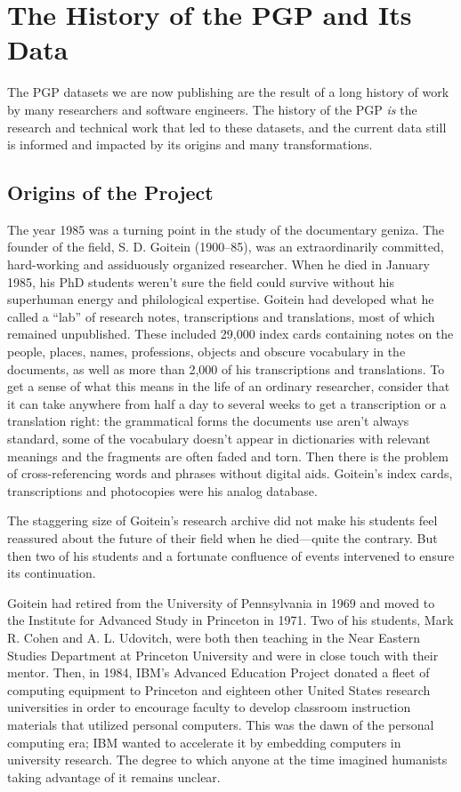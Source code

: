 \documentclass{article}
\begin{document}
\section{The History of the PGP and Its Data}

The PGP datasets we are now publishing are the result of a long history of work by many researchers and software engineers.  The history of the PGP \textit{is} the research and technical work that led to these datasets, and the current data still is informed and impacted by its origins and many transformations.

\subsection{Origins of the Project}

The year 1985 was a turning point in the study of the documentary geniza. The founder of the field, S. D. Goitein (1900–85), was an extraordinarily committed, hard-working and assiduously organized researcher. When he died in January 1985, his PhD students weren’t sure the field could survive without his superhuman energy and philological expertise. Goitein had developed what he called a “lab” of research notes, transcriptions and translations, most of which remained unpublished. These included 29,000 index cards containing notes on the people, places, names, professions, objects and obscure vocabulary in the documents, as well as more than 2,000 of his transcriptions and translations. To get a sense of what this means in the life of an ordinary researcher, consider that it can take anywhere from half a day to several weeks to get a transcription or a translation right: the grammatical forms the documents use aren’t always standard, some of the vocabulary doesn’t appear in dictionaries with relevant meanings and the fragments are often faded and torn. Then there is the problem of cross-referencing words and phrases without digital aids. Goitein’s index cards, transcriptions and photocopies were his analog database. 

The staggering size of Goitein’s research archive did not make his students feel reassured about the future of their field when he died—quite the contrary. But then two of his students and a fortunate confluence of events intervened to ensure its continuation. 

Goitein had retired from the University of Pennsylvania in 1969 and moved to the Institute for Advanced Study in Princeton in 1971. Two of his students, Mark R. Cohen and A. L. Udovitch, were both then teaching in the Near Eastern Studies Department at Princeton University and were in close touch with their mentor. Then, in 1984, IBM’s Advanced Education Project donated a fleet of computing equipment to Princeton and eighteen other United States research universities in order to encourage faculty to develop classroom instruction materials that utilized personal computers. This was the dawn of the personal computing era; IBM wanted to accelerate it by embedding computers in university research. The degree to which anyone at the time imagined humanists taking advantage of it remains unclear.
\end{document}
